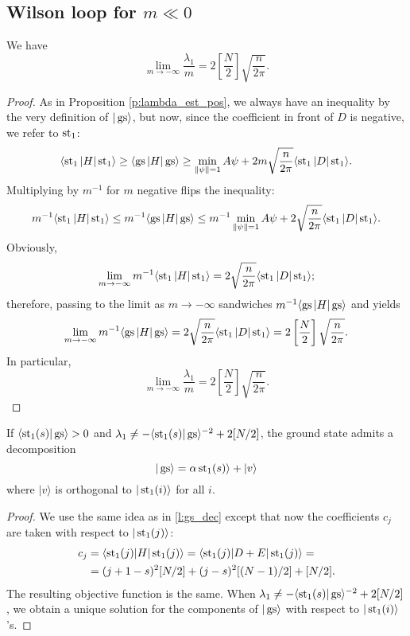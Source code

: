 \subsection{Wilson loop for $m \ll 0$}
\begin{proposition}
We have
\[
\lim_{m \rightarrow -\infty} \frac{\lambda_1}{m} = 2\left[\frac{N}{2}\right]\sqrt{\frac{n}{2\pi}}.
\]
\end{proposition}
\begin{proof}
As in Proposition \ref{p:lambda_est_pos}, we always have an inequality by the very definition of $|\operatorname{gs}\rangle$, but now, since the coefficient in front of $D$ is negative, we refer to $\operatorname{st}_1$:
\[
\langle \operatorname{st}_1 | H|\operatorname{st}_1 \rangle \geq \langle \operatorname{gs} | H|\operatorname{gs}\rangle \geq \min_{\|\psi\| = 1} A\psi + 2m \sqrt{\frac{n}{2\pi}} \langle \operatorname{st}_1 |D|\operatorname{st}_1\rangle.
\]
Multiplying by $m^{-1}$ for $m$ negative flips the inequality:
\[
m^{-1}\langle \operatorname{st}_1 | H|\operatorname{st}_1 \rangle \leq m^{-1}\langle \operatorname{gs} | H|\operatorname{gs}\rangle \leq m^{-1}\min_{\|\psi\| = 1} A\psi + 2 \sqrt{\frac{n}{2\pi}} \langle \operatorname{st}_1 |D|\operatorname{st}_1\rangle.
\]
Obviously,
\[
\lim_{m\rightarrow -\infty} m^{-1}\langle \operatorname{st}_1 | H|\operatorname{st}_1\rangle = 2 \sqrt{\frac{n}{2\pi}} \langle \operatorname{st}_1 |D|\operatorname{st}_1\rangle;
\]
therefore, passing to the limit as $m \rightarrow -\infty$ sandwiches $m^{-1}\langle \operatorname{gs} | H|\operatorname{gs}\rangle$ and yields
\[
\lim_{m \rightarrow -\infty} m^{-1}\langle \operatorname{gs} |H|\operatorname{gs} \rangle = 2 \sqrt{\frac{n}{2\pi}} \langle \operatorname{st}_1 |D|\operatorname{st}_1\rangle = 2\left[\frac{N}{2}\right]\sqrt{\frac{n}{2\pi}}.
\]
In particular, 
\[
\lim_{m \rightarrow -\infty} \frac{\lambda_1}{m} = 2\left[\frac{N}{2}\right]\sqrt{\frac{n}{2\pi}}.
\]
\end{proof}
\begin{lemma}\label{l:gs_dec1}
If $\langle \operatorname{st}_1(s)|\operatorname{gs} \rangle > 0$ and $\lambda_1 \neq -\langle \operatorname{st}_1(s)|\operatorname{gs}\rangle^{-2} + 2[N/2]$, the ground state admits a decomposition
\[
|\operatorname{gs} \rangle = \alpha \operatorname{st}_1(s)\rangle + |v \rangle
\]
where $|v\rangle$ is orthogonal to $|\operatorname{st}_1(i)\rangle$ for all $i$.
\end{lemma}
\begin{proof}
We use the same idea as in \ref{l:gs_dec} except that now the coefficients $c_j$ are taken with respect to $|\operatorname{st}_1(j)\rangle$:
\[\begin{split}
c_j& = \langle\operatorname{st}_1(j) | H | \operatorname{st}_1(j) \rangle =\langle\operatorname{st}_1(j) | D+E | \operatorname{st}_1(j) \rangle=\\&= (j+1-s)^2[N/2] + (j-s)^2[(N-1)/2] + [N/2].
\end{split}
\]
The resulting objective function is the same. When $\lambda_1 \neq -\langle \operatorname{st}_1(s)|\operatorname{gs}\rangle^{-2} + 2[N/2]$, we obtain a unique solution for the components of $|\operatorname{gs}\rangle$ with respect to $|\operatorname{st}_1(i)\rangle$'s.
\end{proof}

